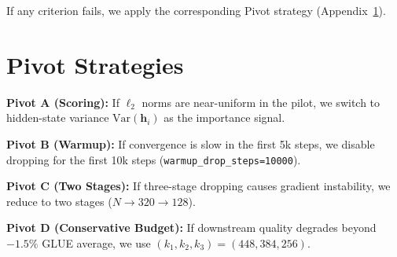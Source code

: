 \documentclass[11pt]{article}
\begin{document}
If any criterion fails, we apply the corresponding Pivot strategy
(Appendix~\ref{app:pivots}).

\section{Pivot Strategies}
\label{app:pivots}

\textbf{Pivot A (Scoring):}
If $\ell_2$ norms are near-uniform in the pilot, we switch to
hidden-state variance $\text{Var}(\mathbf{h}_i)$ as the importance signal.

\textbf{Pivot B (Warmup):}
If convergence is slow in the first 5k steps, we disable dropping for the
first 10k steps (\texttt{warmup\_drop\_steps=10000}).

\textbf{Pivot C (Two Stages):}
If three-stage dropping causes gradient instability, we reduce to two stages
($N \to 320 \to 128$).

\textbf{Pivot D (Conservative Budget):}
If downstream quality degrades beyond $-1.5\%$ GLUE average, we use
$(k_1, k_2, k_3) = (448, 384, 256)$.
\end{document}
